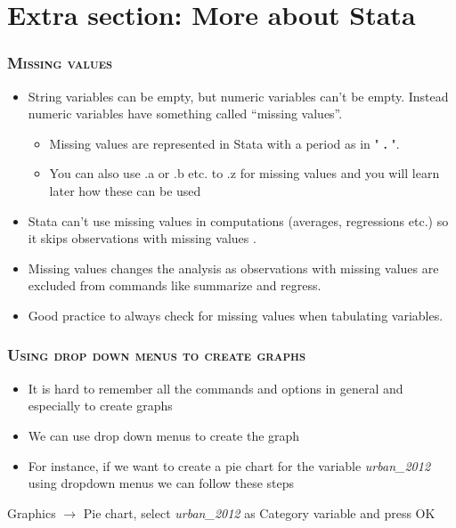 \documentclass[10pt]{beamer}
\begin{document}
	\section{Extra section: More about Stata}
	


	\begin{frame}
	\frametitle{\textsc{Missing values}}
		\begin{itemize}
			\item String variables can be empty, but numeric variables can't be empty. 
				  Instead numeric variables have something called “missing values”.
				\begin{itemize}
					\item Missing values are represented in Stata with a period as in " \textbf{.} ". 
					\item You can also use .a or .b etc. to .z for missing values 
						  and you will learn later how these can be used
				\end{itemize}
			\item Stata can't use missing values in computations (averages, regressions etc.) 
				  so it skips observations with missing values . 
			\item Missing values changes the analysis as observations with 
				  missing values are excluded from commands like summarize and regress.
			\item Good practice to always check for missing values when tabulating variables.			
		\end{itemize}
	\end{frame}
	
	
	\begin{frame}
		\frametitle{\textsc{Using drop down menus to create graphs}}
		
		\begin{itemize}
			\item It is hard to remember all the commands and options in general and especially to create graphs
			\item We can use drop down menus to create the graph
			\item For instance, if we want to create a pie chart for the variable \textit{urban\_2012} using dropdown menus we can follow these steps
			\end{itemize}
			Graphics $\rightarrow$ Pie chart, select \textit{urban\_2012} as Category variable and press OK
		
	\end{frame}
	
\end{document}
